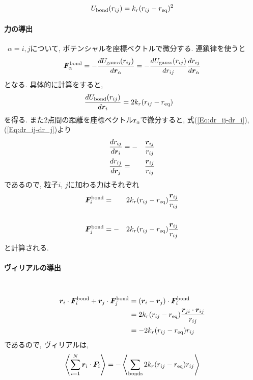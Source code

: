 \begin{equation}
  U_{\mathrm{bond}}(r_{ij}) = k_{r} (r_{ij} - r_{\mathrm{eq}})^{2}
  \notag
\end{equation}

\paragraph{力の導出} \
$\alpha = i, j$について, ポテンシャルを座標ベクトルで微分する. 連鎖律を使うと
\begin{equation}
   \bm{F}_{\alpha}^{\mathrm{bond}}
   =
   -
   \frac{d U_{\mathrm{gauss}}(r_{ij})}{d \bm{r}_{\alpha}}
   =
   -
   \frac{d U_{\mathrm{gauss}}(r_{ij})}{d r_{ij}}
   \frac{d r_{ij}}{d \bm{r}_{\alpha}}
   \notag
\end{equation}
となる. 具体的に計算をすると,
\begin{align}
   \frac{d U_{\mathrm{bond}}(r_{ij})}{d \bm{r}_{i}}
   &=
   2 k_{r} (r_{ij} - r_{\mathrm{eq}})
   \notag
\end{align}
を得る. また2点間の距離を座標ベクトル$\bm{r}_{\alpha}$で微分すると, 式(\ref{Eq:dr_ij-dr_i}), (\ref{Eq:dr_ij-dr_j})より
\begin{alignat}{3}
   \frac{d r_{ij}}{d \bm{r}_{i}}
   &=
   -&&
   \frac{\bm{r}_{ij}}{r_{ij}}
   \notag
   \\
   \frac{d r_{ij}}{d \bm{r}_{j}}
   &=&&
   \frac{\bm{r}_{ij}}{r_{ij}}
   \notag
\end{alignat}
であるので, 粒子$i$, $j$に加わる力はそれぞれ
\begin{alignat}{3}
   \bm{F}_{i}^{\mathrm{bond}}
   &=&&
   2 k_{r} (r_{ij} - r_{\mathrm{eq}})
   \frac{\bm{r}_{ij}}{r_{ij}}
   \notag \\
   \notag \\
   \bm{F}_{j}^{\mathrm{bond}}
   &=
   -&&
   2 k_{r} (r_{ij} - r_{\mathrm{eq}})
   \frac{\bm{r}_{ij}}{r_{ij}}
 \notag
\end{alignat}
と計算される.

\paragraph{ヴィリアルの導出}  \
\begin{align}
    \bm{r}_{i} \cdot \bm{F}_{i}^{\mathrm{bond}}
   +\bm{r}_{j} \cdot \bm{F}_{j}^{\mathrm{bond}}
 &=
    (\bm{r}_{i} -\bm{r}_{j} ) \cdot \bm{F}_{i}^{\mathrm{bond}}
 \notag \\
 &=
    2 k_{r} (r_{ij} - r_{\mathrm{eq}})
    \frac{\bm{r}_{ji} \cdot \bm{r}_{ij}}{r_{ij}}
 \notag \\
 &=
    -2 k_{r} (r_{ij} - r_{\mathrm{eq}}) r_{ij}
 \notag
\end{align}
であるので, ヴィリアルは, 
\begin{align}
   \left\langle
   \sum_{i=1}^{N} \bm{r}_{i} \cdot \bm{F}_{i}
   \right\rangle
 =
 - \left\langle
   \sum_{\mathrm{bonds}} 2 k_{r} (r_{ij} - r_{\mathrm{eq}}) r_{ij}
   \right\rangle
   \notag
\end{align}
\clearpage

